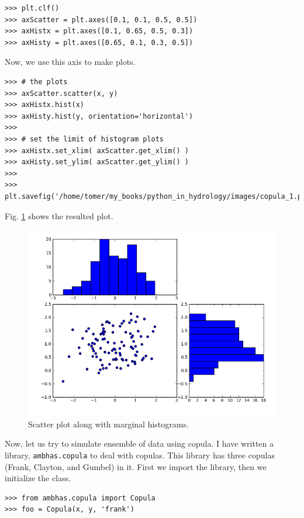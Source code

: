 \documentclass[10pt]{book}
\begin{document}
\beforeverb \begin{verbatim}
>>> plt.clf()
>>> axScatter = plt.axes([0.1, 0.1, 0.5, 0.5])
>>> axHistx = plt.axes([0.1, 0.65, 0.5, 0.3])
>>> axHisty = plt.axes([0.65, 0.1, 0.3, 0.5])
\end{verbatim} \afterverb

Now, we use this axis to make plots. 
\beforeverb \begin{verbatim}
>>> # the plots
>>> axScatter.scatter(x, y)
>>> axHistx.hist(x)
>>> axHisty.hist(y, orientation='horizontal')
>>> 
>>> # set the limit of histogram plots
>>> axHistx.set_xlim( axScatter.get_xlim() )
>>> axHisty.set_ylim( axScatter.get_ylim() )
>>> 
>>> plt.savefig('/home/tomer/my_books/python_in_hydrology/images/copula_1.png')
\end{verbatim} \afterverb

Fig. \ref{fig:copula1} shows the resulted plot. 
\beforefig
\begin{figure}[h!]
  \centering
    \includegraphics[scale=0.5]{images/copula_1.png}
  \caption{Scatter plot along with marginal histograms.}
   \label{fig:copula1}
\end{figure}
\afterfig

Now, let us try to simulate ensemble of data using copula. I have written a library, \verb"ambhas.copula" to deal with copulas. This library has three copulas (Frank, Clayton, and Gumbel) in it. First we import the library, then we initialize the class. 

\beforeverb \begin{verbatim}
>>> from ambhas.copula import Copula
>>> foo = Copula(x, y, 'frank')
\end{verbatim} \afterverb
\end{document}
